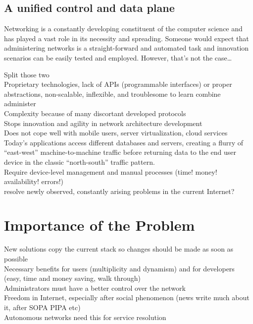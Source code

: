 \documentclass[12pt,a4paper,oneside]{article}
\begin{document}
\newpage
\subsection{A unified control and data plane}
Networking is a constantly developing constituent of the computer science and has played a vast role in its necessity and spreading.
Someone would expect that administering networks is a straight-forward and automated task and innovation scenarios can be easily tested and employed.
However, that's not the case\ldots \\
\indent 


Split those two
\\Proprietary technologies, lack of APIs (programmable interfaces) or proper abstractions, non-scalable, inflexible, and troublesome to learn combine administer
\\Complexity because of many discortant developed protocols
\\Stops innovation and agility in network architecture development
\\Does not cope well with mobile users, server virtualization, cloud services
\\Today’s applications access different databases and servers, creating a flurry of “east-west” machine-to-machine traffic before returning data to the end user device in the classic “north-south” traffic pattern.
\\Require device-level management and manual processes (time! money! availability! errors!)
\\resolve newly observed, constantly arising problems in the current Internet?


\newpage
\section{Importance of the Problem}
New solutions copy the current stack so changes should be made as soon as possible
\\Necessary benefits for users (multiplicity and dynamism) and for developers (easy, time and money saving, walk through)
\\Administrators must have a better control over the network
\\Freedom in Internet, especially after social phenomenon (news write much about it, after SOPA PIPA etc)
\\Autonomous networks need this for service resolution
\end{document}
